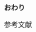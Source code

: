 \nofootertrue
\begin{frame}
    \vfill
    \centering
    {\Huge \textbf{おわり}}
    \vfill
\end{frame}

    \nocite{*}
\begin{frame}{参考文献}
    \scriptsize
    \printbibliography[heading=none]
\end{frame}

